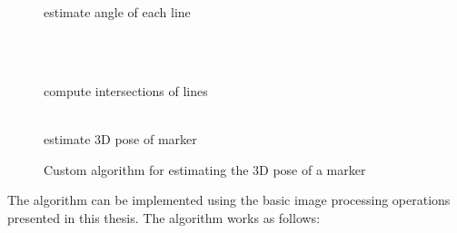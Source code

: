 \documentclass[12pt,a4paper,oneside,openright]{book}
\begin{document}
\begin{CJK}{UTF8}{}
\begin{figure}[htbp]
\begin{center}
\begin{minipage}[t]{.32\textwidth}
\begin{center}
        estimate angle of each line
      \end{center}
    \end{minipage}\medskip\\
    \begin{minipage}[t]{.32\textwidth}
      \begin{center}
        \\
        compute intersections of lines
      \end{center}
    \end{minipage}
    \begin{minipage}[t]{.32\textwidth}
      \begin{center}
        \\
        estimate 3D pose of marker
      \end{center}
    \end{minipage}
    \caption{Custom algorithm for estimating the \acs{3D} pose of a marker\label{fig:ar}}
  \end{center}
\end{figure}
The algorithm can be implemented using the basic image processing operations presented in this thesis. The algorithm works as follows:
\begin{enumerate}

\end{enumerate}
\end{CJK}
\end{document}
